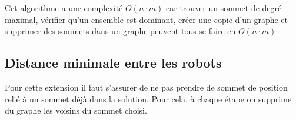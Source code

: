 



\vspace{2\baselineskip}

Cet algorithme a une complexité $O(n\cdot m)$ car trouver un sommet de degré maximal, vérifier qu'un ensemble est dominant, créer une copie d'un graphe et supprimer des sommets dans un graphe peuvent tous se faire en $O(n\cdot m)$

\subsection{Distance minimale entre les robots}
Pour cette extension il faut s'assurer de ne pas prendre de sommet de position relié à un sommet déjà dans la solution. Pour cela, à chaque étape on supprime du graphe les voisins du sommet choisi.\newline

